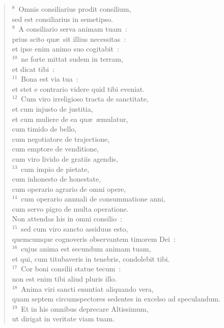 \begin{flushleft}\begin{verse}${}^{8}$~Omnis consiliarius prodit consilium,\\ sed est consiliarius in semetipso.\\
${}^{9}$~A consiliario serva animam tuam~:\\ prius scito qu\ae\ sit illius necessitas~:\\ et ipse enim animo suo cogitabit~:\\
${}^{10}$~ne forte mittat sudem in terram,\\ et dicat tibi~:\\
${}^{11}$~Bona est via tua~:\\ et stet e contrario videre quid tibi eveniat.\\
${}^{12}$~Cum viro irreligioso tracta de sanctitate,\\ et cum injusto de justitia,\\ et cum muliere de ea qu\ae\ \ae mulatur,\\ cum timido de bello,\\ cum negotiatore de trajectione,\\ cum emptore de venditione,\\ cum viro livido de gratiis agendis,\\
${}^{13}$~cum impio de pietate,\\ cum inhonesto de honestate,\\ cum operario agrario de omni opere,\\
${}^{14}$~cum operario annuali de consummatione anni,\\ cum servo pigro de multa operatione.\\ Non attendas his in omni consilio~:\\
${}^{15}$~sed cum viro sancto assiduus esto,\\ quemcumque cognoveris observantem timorem Dei~:\\
${}^{16}$~cujus anima est secundum animam tuam,\\ et qui, cum titubaveris in tenebris, condolebit tibi.\\
${}^{17}$~Cor boni consilii statue tecum~:\\ non est enim tibi aliud pluris illo.\\
${}^{18}$~Anima viri sancti enuntiat aliquando vera,\\ quam septem circumspectores sedentes in excelso ad speculandum.\\
${}^{19}$~Et in his omnibus deprecare Altissimum,\\ ut dirigat in veritate viam tuam.\end{verse}\end{flushleft}



